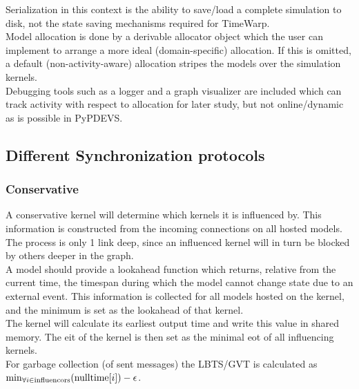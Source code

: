 Serialization in this context is the ability to save/load a complete simulation to disk, not the state saving mechanisms required for TimeWarp. %
\\
Model allocation is done by a derivable allocator object which the user can implement to arrange a more ideal (domain-specific) allocation. If this is omitted, a default (non-activity-aware) allocation stripes the models over the simulation kernels.\\
Debugging tools such as a logger and a graph visualizer are included which can track activity with respect to allocation for later study, but not online/dynamic as is possible in PyPDEVS.

\subsection{Different Synchronization protocols}
\subsubsection{Conservative}
A conservative kernel will determine which kernels it is influenced by. This information is constructed from the incoming connections on all hosted models. The process is only 1 link deep, since an influenced kernel will in turn be blocked by others deeper in the graph.\\
A model should provide a lookahead function which returns, relative from the current time, the timespan during which the model cannot change state due to an external event. This information is collected for all models hosted on the kernel, and the minimum is set as the lookahead of that kernel. \\
The kernel will calculate its earliest output time and write this value in shared memory. The eit of the kernel is then set as the minimal eot of all influencing kernels. \\
For garbage collection (of sent messages) the LBTS/GVT is calculated as $\min_{\forall i \in \textup{influencors}}( \textup{nulltime}[i])  - \epsilon $. %

